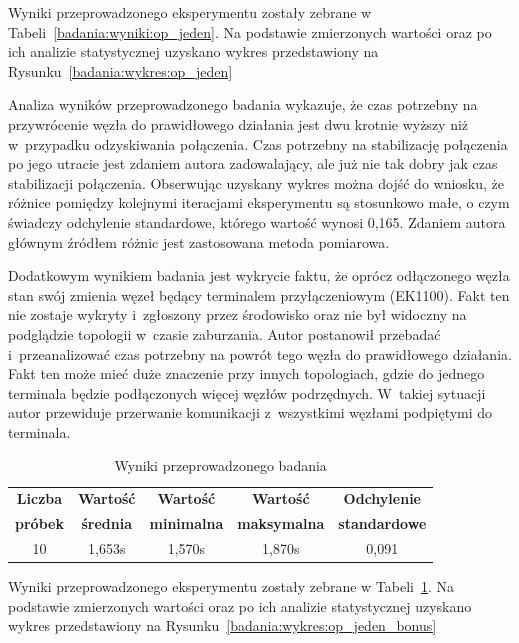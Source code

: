\noindent Wyniki przeprowadzonego eksperymentu zostały zebrane w Tabeli~\ref{badania:wyniki:op_jeden}. Na podstawie zmierzonych wartości oraz po ich analizie statystycznej uzyskano wykres przedstawiony na Rysunku~\ref{badania:wykres:op_jeden}


Analiza wyników przeprowadzonego badania wykazuje, że czas potrzebny na przywrócenie węzła do prawidłowego działania jest dwu krotnie wyższy niż w~przypadku odzyskiwania połączenia. Czas potrzebny na stabilizację połączenia po jego utracie jest zdaniem autora zadowalający, ale już nie tak dobry jak czas stabilizacji połączenia. Obserwując uzyskany wykres można dojść do wniosku, że różnice pomiędzy kolejnymi iteracjami eksperymentu są stosunkowo małe, o czym świadczy odchylenie standardowe, którego wartość wynosi 0,165. Zdaniem autora głównym źródłem różnic jest zastosowana metoda pomiarowa.

Dodatkowym wynikiem badania jest wykrycie faktu, że oprócz odłączonego węzła stan swój zmienia węzeł będący terminalem przyłączeniowym (EK1100). Fakt ten nie zostaje wykryty i~zgłoszony przez środowisko oraz nie był widoczny na podglądzie topologii w~czasie zaburzania. Autor postanowił przebadać i~przeanalizować czas potrzebny na powrót tego węzła do prawidłowego działania. Fakt ten może mieć duże znaczenie przy innych topologiach, gdzie do jednego terminala będzie podłączonych więcej węzłów podrzędnych. W~takiej sytuacji autor przewiduje przerwanie komunikacji z~wszystkimi węzłami podpiętymi do terminala.

\begin{table}[!htb]
\begin{center}
\begin{tabular}{| c | c | c | c | c |}\hline
\textbf{Liczba} & \textbf{Wartość} & \textbf{Wartość} & \textbf{Wartość} & \textbf{Odchylenie} \\
\textbf{próbek} & \textbf{średnia} & \textbf{minimalna} & \textbf{maksymalna} & \textbf{standardowe} \\\hline\hline
10 & 1,653s & 1,570s & 1,870s & 0,091\\\hline
\end{tabular}
\end{center}
\vspace*{-6mm}
  \caption{Wyniki przeprowadzonego badania}
	\label{badania:wyniki:op_jeden_bonus}
\end{table}

\noindent Wyniki przeprowadzonego eksperymentu zostały zebrane w Tabeli~\ref{badania:wyniki:op_jeden_bonus}. Na podstawie zmierzonych wartości oraz po ich analizie statystycznej uzyskano wykres przedstawiony na Rysunku~\ref{badania:wykres:op_jeden_bonus}


